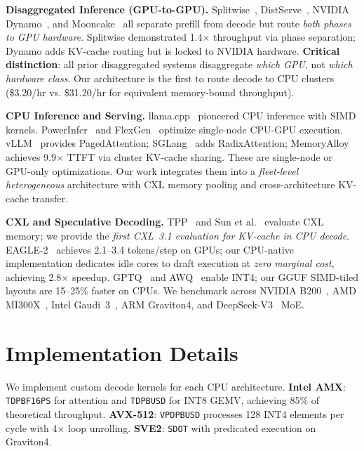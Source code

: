 \documentclass[conference,10pt]{IEEEtran}
\begin{document}
\textbf{Disaggregated Inference (GPU-to-GPU).} Splitwise~\cite{patel2024splitwise}, DistServe~\cite{zhong2024distserve}, NVIDIA Dynamo~\cite{nvidia2024b200}, and Mooncake~\cite{qin2024mooncake} all separate prefill from decode but route \emph{both phases to GPU hardware}. Splitwise demonstrated 1.4$\times$ throughput via phase separation; Dynamo adds KV-cache routing but is locked to NVIDIA hardware. \textbf{Critical distinction}: all prior disaggregated systems disaggregate \emph{which GPU}, not \emph{which hardware class}. Our architecture is the first to route decode to CPU clusters (\$3.20/hr vs. \$31.20/hr for equivalent memory-bound throughput).

\textbf{CPU Inference and Serving.} llama.cpp~\cite{gerganov2024llamacpp} pioneered CPU inference with SIMD kernels. PowerInfer~\cite{song2024powerinfer} and FlexGen~\cite{sheng2023flexgen} optimize single-node CPU-GPU execution. vLLM~\cite{kwon2023vllm} provides PagedAttention; SGLang~\cite{zheng2024sglang} adds RadixAttention; MemoryAlloy~\cite{crusoe2025memoryalloy} achieves 9.9$\times$ TTFT via cluster KV-cache sharing. These are single-node or GPU-only optimizations. Our work integrates them into a \emph{fleet-level heterogeneous} architecture with CXL memory pooling and cross-architecture KV-cache transfer.

\textbf{CXL and Speculative Decoding.} TPP~\cite{maruf2023cxl} and Sun et al.~\cite{sun2024cxl} evaluate CXL memory; we provide the \emph{first CXL~3.1 evaluation for KV-cache in CPU decode}. EAGLE-2~\cite{li2024eagle2} achieves 2.1--3.4 tokens/step on GPUs; our CPU-native implementation dedicates idle cores to draft execution at \emph{zero marginal cost}, achieving 2.8$\times$ speedup. GPTQ~\cite{frantar2023gptq} and AWQ~\cite{lin2024awq} enable INT4; our GGUF SIMD-tiled layouts are 15--25\% faster on CPUs. We benchmark across NVIDIA B200~\cite{nvidia2024b200}, AMD MI300X~\cite{amd2024mi300x}, Intel Gaudi~3~\cite{intel2024gaudi3}, ARM Graviton4, and DeepSeek-V3~\cite{deepseek2024v3} MoE.

\section{Implementation Details}
\label{sec:impl}

We implement custom decode kernels for each CPU architecture. \textbf{Intel AMX}: \texttt{TDPBF16PS} for attention and \texttt{TDPBUSD} for INT8 GEMV, achieving 85\% of theoretical throughput. \textbf{AVX-512}: \texttt{VPDPBUSD} processes 128 INT4 elements per cycle with 4$\times$ loop unrolling. \textbf{SVE2}: \texttt{SDOT} with predicated execution on Graviton4.
\end{document}
